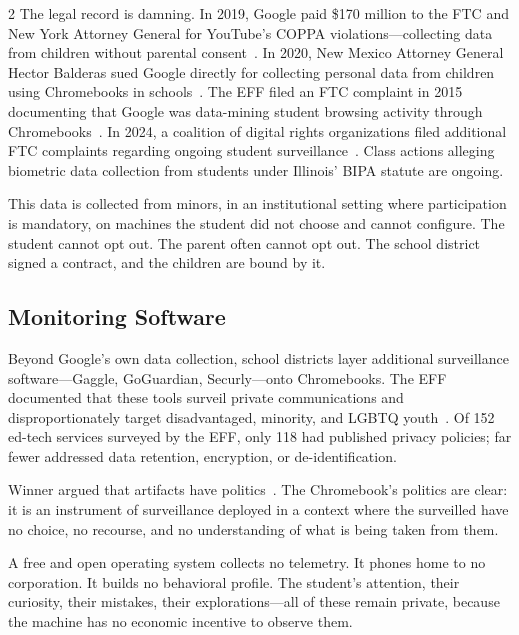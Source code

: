 \documentclass[11pt, a4paper]{article}
\begin{document}
\begin{multicols}{2}
The legal record is damning. In 2019, Google paid \$170 million to the FTC and New York Attorney General for YouTube's COPPA violations---collecting data from children without parental consent~\citep{google2019coppa}. In 2020, New Mexico Attorney General Hector Balderas sued Google directly for collecting personal data from children using Chromebooks in schools~\citep{newmexico2020google}. The EFF filed an FTC complaint in 2015 documenting that Google was data-mining student browsing activity through Chromebooks~\citep{eff2015chromebook}. In 2024, a coalition of digital rights organizations filed additional FTC complaints regarding ongoing student surveillance~\citep{eff2024monitoring}. Class actions alleging biometric data collection from students under Illinois' BIPA statute are ongoing.

This data is collected from minors, in an institutional setting where participation is mandatory, on machines the student did not choose and cannot configure. The student cannot opt out. The parent often cannot opt out. The school district signed a contract, and the children are bound by it.

\subsection{Monitoring Software}

Beyond Google's own data collection, school districts layer additional surveillance software---Gaggle, GoGuardian, Securly---onto Chromebooks. The EFF documented that these tools surveil private communications and disproportionately target disadvantaged, minority, and LGBTQ youth~\citep{eff2024monitoring}. Of 152 ed-tech services surveyed by the EFF, only 118 had published privacy policies; far fewer addressed data retention, encryption, or de-identification.

Winner argued that artifacts have politics~\citep{winner1980artifacts}. The Chromebook's politics are clear: it is an instrument of surveillance deployed in a context where the surveilled have no choice, no recourse, and no understanding of what is being taken from them.

A free and open operating system collects no telemetry. It phones home to no corporation. It builds no behavioral profile. The student's attention, their curiosity, their mistakes, their explorations---all of these remain private, because the machine has no economic incentive to observe them.



\end{multicols}
\end{document}
